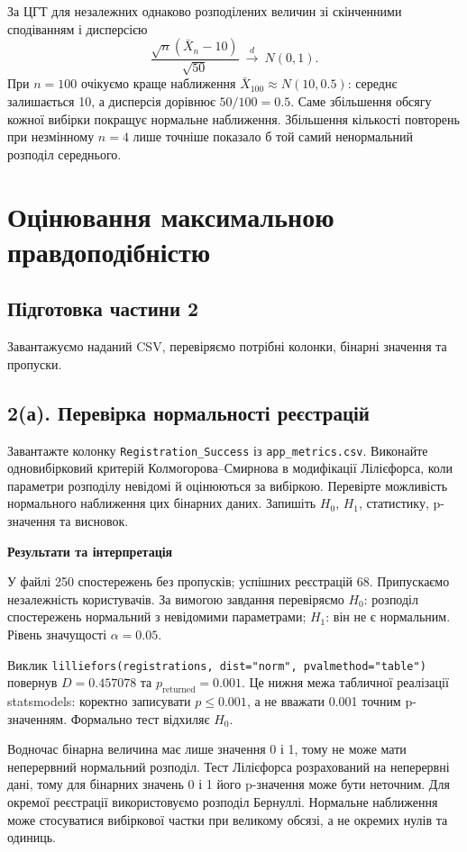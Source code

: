 \documentclass[11pt,a4paper]{article}
\newcommand{\pythoncode}[1]{%
  \Needspace{6\baselineskip}
  \begin{tcolorbox}[enhanced,breakable,colback=black!2!white,colframe=black!15!white,
    colbacktitle=black!6!white,coltitle=accent,fonttitle=\bfseries\small,
    title=Код Python,title after break={Код Python (продовження)},boxrule=0.4pt,arc=1mm,left=2mm,right=2mm,top=2mm,bottom=2mm,
    before skip=6pt,after skip=8pt]
  
  \end{tcolorbox}}
\newcommand{\answerheading}{\Needspace{4\baselineskip}\par\medskip
  {\color{answergreen}\bfseries Результати та інтерпретація}\par\smallskip}
\begin{document}
За ЦГТ для незалежних однаково розподілених величин зі скінченними сподіванням і дисперсією \[\frac{\sqrt n(\bar X_n-10)}{\sqrt{50}}\ \xrightarrow{d}\ N(0,1).\] При \(n=100\) очікуємо краще наближення \(\bar X_{100}\approx N(10,0.5)\): середнє залишається 10, а дисперсія дорівнює \(50/100=0.5\). Саме збільшення обсягу кожної вибірки покращує нормальне наближення. Збільшення кількості повторень при незмінному \(n=4\) лише точніше показало б той самий ненормальний розподіл середнього.

\clearpage
\section{Оцінювання максимальною правдоподібністю}
\subsection*{Підготовка частини 2}
Завантажуємо наданий CSV, перевіряємо потрібні колонки, бінарні значення та пропуски.
\pythoncode{part2-cell2}
\subsection*{2(а). Перевірка нормальності реєстрацій}
\begin{taskstatement}
Завантажте колонку \texttt{Registration\_Success} із \texttt{app\_metrics.csv}.
Виконайте одновибірковий критерій Колмогорова--Смирнова в модифікації Лілієфорса, коли параметри розподілу невідомі й оцінюються за вибіркою.
Перевірте можливість нормального наближення цих бінарних даних. Запишіть $H_0$, $H_1$, статистику, p-значення та висновок.
\end{taskstatement}


\pythoncode{part2-cell4}
\answerheading
У файлі 250 спостережень без пропусків; успішних реєстрацій 68. Припускаємо незалежність користувачів. За вимогою завдання перевіряємо \(H_0\): розподіл спостережень нормальний з невідомими параметрами; \(H_1\): він не є нормальним. Рівень значущості \(\alpha=0.05\).

Виклик \texttt{lilliefors(registrations,\ dist="norm",\ pvalmethod="table")} повернув \(D=0.457078\) та \(p_{\mathrm{returned}}=0.001\). Це нижня межа табличної реалізації statsmodels: коректно записувати \(p\le0.001\), а не вважати 0.001 точним p-значенням. Формально тест відхиляє \(H_0\).

Водночас бінарна величина має лише значення 0 і 1, тому не може мати неперервний нормальний розподіл. Тест Лілієфорса розрахований на неперервні дані, тому для бінарних значень 0 і 1 його p-значення може бути неточним. Для окремої реєстрації використовуємо розподіл Бернуллі. Нормальне наближення може стосуватися вибіркової частки при великому обсязі, а не окремих нулів та одиниць.
\end{document}
